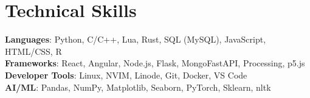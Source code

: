 \documentclass[letterpaper,11pt]{article}
\begin{document}
%
\section{Technical Skills}
 \begin{itemize}[leftmargin=0.15in, label={}]
    \small{\item{
     \textbf{Languages}{: Python, C/C++, Lua, Rust, SQL (MySQL), JavaScript, HTML/CSS, R} \\
     \textbf{Frameworks}{: React, Angular, Node.js, Flask, MongoFastAPI, Processing, p5.js} \\
     \textbf{Developer Tools}{: Linux, NVIM, Linode, Git, Docker, VS Code} \\
     \textbf{AI/ML}{: Pandas, NumPy, Matplotlib, Seaborn, PyTorch, Sklearn, nltk}
    }}
 \end{itemize}


\end{document}
